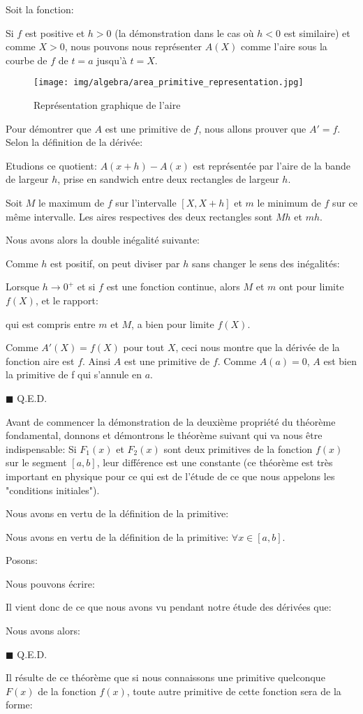 	\begin{dem}
	Soit la fonction:
	
	Si $f$ est positive et $h>0$ (la démonstration dans le cas où $h<0$ est  similaire) et comme $X>0$, nous pouvons nous représenter $A(X)$ comme l'aire sous la courbe de $f$ de $t=a$ jusqu'à $t=X$.
	\begin{figure}[H]
		\centering
		\texttt{[image: img/algebra/area\_primitive\_representation.jpg]}
		\caption{Représentation graphique de l'aire}
	\end{figure}
	Pour démontrer que $A$ est une primitive de $f$, nous allons prouver que $A'=f$. Selon la définition de la dérivée:
	
	Etudions ce quotient: $A(x+h)-A(x)$ est représentée par l'aire de la bande de largeur $h$, prise en sandwich entre deux rectangles de largeur $h$.
	
	Soit $M$ le maximum de $f$ sur l'intervalle $[X,X+h]$ et $m$ le minimum de $f$ sur ce même intervalle. Les aires respectives des deux rectangles sont $Mh$ et $mh$.
	
	Nous avons alors la double inégalité suivante:
	

	Comme $h$ est positif, on peut diviser par $h$ sans changer le sens des inégalités:
	
	Lorsque $h\rightarrow 0^+$ et si $f$ est une fonction continue, alors $M$ et $m$ ont pour limite $f(X)$, et le rapport:
	
	qui est compris entre $m$ et $M$, a bien pour limite $f(X)$.
	
	Comme $A'(X)=f(X)$ pour tout $X$, ceci nous montre que la dérivée de la fonction aire est $f$. Ainsi $A$ est une primitive de $f$. Comme $A(a)=0$, $A$ est bien la primitive de f qui s'annule en $a$.
	\begin{flushright}
		$\blacksquare$  Q.E.D.
	\end{flushright}
	\end{dem}
	Avant de commencer la démonstration de la deuxième propriété du théorème fondamental, donnons et démontrons le théorème suivant qui va nous être indispensable: Si $F_1(x)$ et $F_2(x)$ sont deux primitives de la fonction $f(x)$ sur le segment $[a, b]$, leur différence est une constante (ce théorème est très important en physique pour ce qui est de l'étude de ce que nous appelons les "conditions initiales").
	\begin{dem}
	Nous avons en vertu de la définition de la primitive:
	
	Nous avons en vertu de la définition de la primitive: $\forall x \in [a,b]$.
	
	Posons:
	
	Nous pouvons écrire:
	
	Il vient donc de ce que nous avons vu pendant notre étude des dérivées que:
	
	Nous avons alors:
	
	\begin{flushright}
		$\blacksquare$  Q.E.D.
	\end{flushright}
	\end{dem}
	Il résulte de ce théorème que si nous connaissons une primitive quelconque $F(x)$ de la fonction $f(x)$, toute autre primitive de cette fonction sera de la forme:
	
